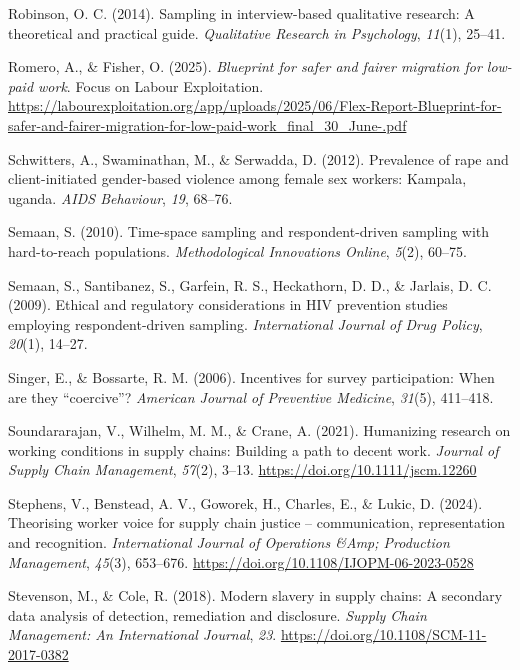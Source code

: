 \documentclass[
  12pt,
]{article}
\newlength{\cslhangindent}
\newenvironment{CSLReferences}[2] %
 {\begin{list}{}{%
  \setlength{\itemindent}{0pt}
  \setlength{\leftmargin}{0pt}
  \setlength{\parsep}{0pt}
  \ifodd #1
   \setlength{\leftmargin}{\cslhangindent}
   \setlength{\itemindent}{-1\cslhangindent}
  \fi
  \setlength{\itemsep}{#2\baselineskip}}}
 {\end{list}}
\theoremstyle{plain}
\theoremstyle{definition}
\begin{document}
\begin{CSLReferences}{1}{0}
Robinson, O. C. (2014). Sampling in interview-based qualitative
research: A theoretical and practical guide. \emph{Qualitative Research
in Psychology}, \emph{11}(1), 25--41.

Romero, A., \& Fisher, O. (2025). \emph{Blueprint for safer and fairer
migration for low-paid work}. Focus on Labour Exploitation.
\url{https://labourexploitation.org/app/uploads/2025/06/Flex-Report-Blueprint-for-safer-and-fairer-migration-for-low-paid-work_final_30_June-.pdf}

Schwitters, A., Swaminathan, M., \& Serwadda, D. (2012). Prevalence of
rape and client-initiated gender-based violence among female sex
workers: Kampala, uganda. \emph{{AIDS} Behaviour}, \emph{19}, 68--76.

Semaan, S. (2010). Time-space sampling and respondent-driven sampling
with hard-to-reach populations. \emph{Methodological Innovations
Online}, \emph{5}(2), 60--75.

Semaan, S., Santibanez, S., Garfein, R. S., Heckathorn, D. D., \&
Jarlais, D. C. (2009). Ethical and regulatory considerations in {HIV}
prevention studies employing respondent-driven sampling.
\emph{International Journal of Drug Policy}, \emph{20}(1), 14--27.

Singer, E., \& Bossarte, R. M. (2006). Incentives for survey
participation: When are they {``coercive''}? \emph{American Journal of
Preventive Medicine}, \emph{31}(5), 411--418.

Soundararajan, V., Wilhelm, M. M., \& Crane, A. (2021). Humanizing
research on working conditions in supply chains: Building a path to
decent work. \emph{Journal of Supply Chain Management}, \emph{57}(2),
3--13. \url{https://doi.org/10.1111/jscm.12260}

Stephens, V., Benstead, A. V., Goworek, H., Charles, E., \& Lukic, D.
(2024). Theorising worker voice for supply chain justice --
communication, representation and recognition. \emph{International
Journal of Operations \&Amp; Production Management}, \emph{45}(3),
653--676. \url{https://doi.org/10.1108/IJOPM-06-2023-0528}

Stevenson, M., \& Cole, R. (2018). Modern slavery in supply chains: A
secondary data analysis of detection, remediation and disclosure.
\emph{Supply Chain Management: An International Journal}, \emph{23}.
\url{https://doi.org/10.1108/SCM-11-2017-0382}


\end{CSLReferences}
\end{document}
